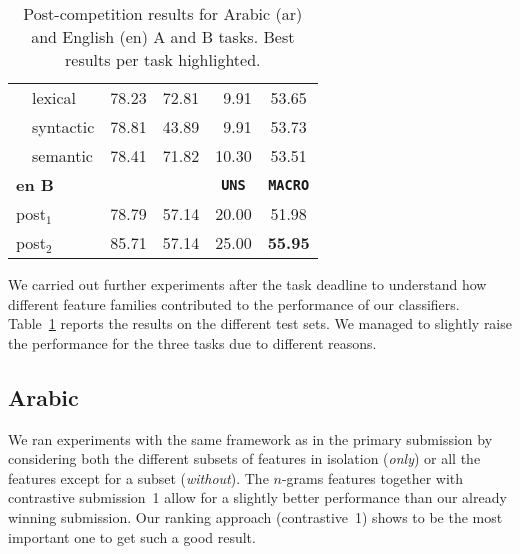 \begin{table}
\begin{tabular}{|l|c@{\hskip 0.3cm}c@{\hskip 0.3cm}c@{\hskip 0.3cm}c|}
 \,\,\,\, lexical	& 78.23	& 72.81	& \,\,\,9.91	& 53.65	\\
 \,\,\,\, syntactic	& 78.81	& 43.89	& \,\,\,9.91	& 53.73	 \\
 \,\,\,\, semantic	& 78.41	& 71.82	& 10.30		& 53.51	 \\   
  \hline
  \hline
  \bf en B	& \bf \yes & \bf \no & \bf \texttt{UNS} & \bf \texttt{MACRO}	
 \\
 \hline
 post$_1$	& 78.79	& 57.14	& 20.00	& 51.98 \\
 post$_2$	& 85.71	& 57.14	& 25.00 & \bf 55.95 \\
 \hline
 \end{tabular}
 \caption{Post-competition results for Arabic (ar) and English (en) A and B 
tasks. Best results per task highlighted.
\label{tab:aftertask}}
\end{table}


We carried out further experiments after the task deadline to understand how 
different feature families contributed to the performance of our classifiers. 
Table~\ref{tab:aftertask} reports the results on the different test sets. We 
managed to slightly raise the performance for the three tasks due to different 
reasons.





\subsection{Arabic} \label{sec:discussionArabic}

We ran experiments with the same framework as in the primary submission by 
considering both the different subsets of features in isolation (\textit{only}) 
or all the features except for a subset (\textit{without}). The $n$-grams 
features together with contrastive submission~1 allow for a slightly better 
performance than our already winning submission. Our ranking approach 
(contrastive~1) shows to be the most important one to get such a good result.



